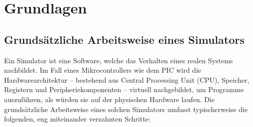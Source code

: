 \chapter{Grundlagen}

\section{Grundsätzliche Arbeitsweise eines Simulators}

Ein Simulator ist eine Software, welche das Verhalten eines realen Systems nachbildet. Im Fall eines Mikrocontrollers wie dem PIC wird die Hardwarearchitektur – bestehend aus Central Processing Unit (CPU), Speicher, Registern und Peripheriekomponenten – virtuell nachgebildet, um Programme auszuführen, als würden sie auf der physischen Hardware laufen. Die grundsätzliche Arbeitsweise eines solchen Simulators umfasst typischerweise die folgenden, eng miteinander verzahnten Schritte:

